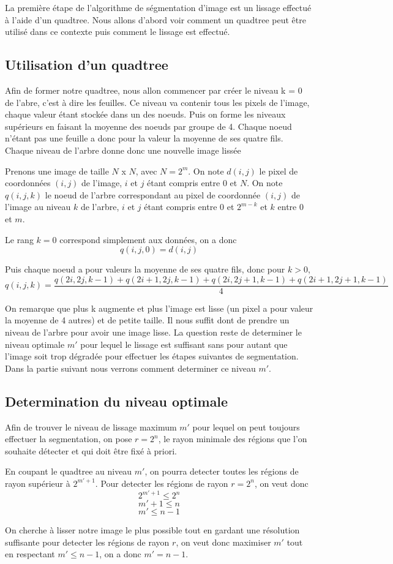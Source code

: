 La première étape de l'algorithme de ségmentation d'image est un lissage effectué à l'aide d'un quadtree. Nous allons d'abord voir comment un quadtree peut être utilisé dans ce contexte puis comment le lissage est effectué.

\subsection{Utilisation d'un quadtree}
	Afin de former notre quadtree, nous allon commencer par créer le niveau k = 0 de l'abre, c'est à dire les feuilles. Ce niveau va contenir tous les pixels de l'image, chaque valeur étant stockée dans un des noeuds. Puis on forme les niveaux supérieurs en faisant la moyenne des noeuds par groupe de 4. Chaque noeud n'étant pas une feuille a donc pour la valeur la moyenne de ses quatre fils. Chaque niveau de l'arbre donne donc une nouvelle image lissée

	Prenons une image de taille $N$ x $N$, avec $N=2^m$. On note $d(i,j)$ le pixel de coordonnées $(i,j)$ de l'image, $i$ et $j$ étant compris entre 0 et $N$. On note $q(i,j,k)$ le noeud de l'arbre correspondant au pixel de coordonnée $(i,j)$ de l'image au niveau $k$ de l'arbre, $i$ et $j$ étant compris entre 0 et $2^{m-k}$ et $k$ entre 0 et $m$.

	Le rang $k=0$ correspond simplement aux données, on a donc \[q(i,j,0) = d(i,j)\]

	Puis chaque noeud a pour valeurs la moyenne de ses quatre fils, donc pour $k > 0$,
	\[ q(i,j,k) = \frac{q(2i, 2j, k-1) + q(2i+1, 2j, k-1) + q(2i, 2j+1, k-1) + q(2i+1, 2j+1, k-1)}{4}\]


	On remarque que plus k augmente et plus l'image est lisse (un pixel a pour valeur la moyenne de 4 autres) et de petite taille. Il nous suffit dont de prendre un niveau de l'arbre pour avoir une image lisse. La question reste de determiner le niveau optimale $m'$ pour lequel le lissage est suffisant sans pour autant que l'image soit trop dégradée pour effectuer les étapes suivantes de segmentation. Dans la partie suivant nous verrons comment determiner ce niveau $m'$.

\subsection{Determination du niveau optimale}
	Afin de trouver le niveau de lissage maximum $m'$ pour lequel on peut toujours effectuer la segmentation, on pose $r = 2^n$, le rayon minimale des régions que l'on souhaite détecter et qui doit être fixé à priori.

	En coupant le quadtree au niveau $m'$, on pourra detecter toutes les régions de rayon supérieur à $2^{m'+1}$. Pour detecter les régions de rayon $r=2^n$, on veut donc 
	\[ 2^{m'+1} \leq 2^n \]
	\[ m'+1 \leq n \]
	\[ m' \leq n-1 \]

	On cherche à lisser notre image le plus possible tout en gardant une résolution suffisante pour detecter les régions de rayon $r$, on veut donc maximiser $m'$ tout en respectant $m' \leq n-1$, on a donc $m' = n-1$.